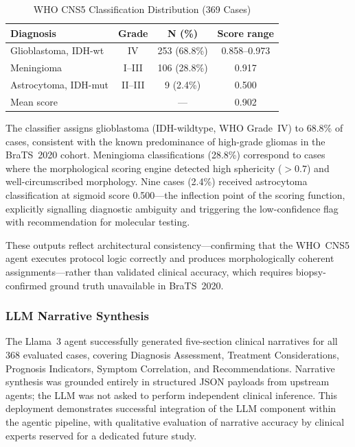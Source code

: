 \documentclass[journal]{IEEEtran}
\begin{document}
\begin{table}[h]
\centering
\caption{WHO CNS5 Classification Distribution (369 Cases)}
\label{tab:who}
\begin{tabular}{lccc}
\toprule
\textbf{Diagnosis} & \textbf{Grade} & \textbf{N (\%)} &
\textbf{Score range} \\
\midrule
Glioblastoma, IDH-wt  & IV    & 253 (68.8\%) & 0.858--0.973 \\
Meningioma            & I--III & 106 (28.8\%) & 0.917 \\
Astrocytoma, IDH-mut  & II--III & 9 (2.4\%)  & 0.500 \\
\midrule
Mean score            &       & ---          & 0.902 \\
\bottomrule
\end{tabular}
\end{table}

The classifier assigns glioblastoma (IDH-wildtype, WHO Grade~IV) to 68.8\%
of cases, consistent with the known predominance of high-grade gliomas in
the BraTS~2020 cohort. Meningioma classifications (28.8\%) correspond to
cases where the morphological scoring engine detected high sphericity
($>0.7$) and well-circumscribed morphology. Nine cases (2.4\%) received
astrocytoma classification at sigmoid score 0.500---the inflection point
of the scoring function, explicitly signalling diagnostic ambiguity and
triggering the low-confidence flag with recommendation for molecular
testing.

These outputs reflect architectural consistency---confirming that the
WHO~CNS5 agent executes protocol logic correctly and produces morphologically
coherent assignments---rather than validated clinical accuracy, which
requires biopsy-confirmed ground truth unavailable in BraTS~2020.

\subsubsection{LLM Narrative Synthesis}

The Llama~3 agent successfully generated five-section clinical narratives
for all 368 evaluated cases, covering Diagnosis Assessment, Treatment
Considerations, Prognosis Indicators, Symptom Correlation, and
Recommendations. Narrative synthesis was grounded entirely in structured
JSON payloads from upstream agents; the LLM was not asked to perform
independent clinical inference. This deployment demonstrates successful
integration of the LLM component within the agentic pipeline, with
qualitative evaluation of narrative accuracy by clinical experts reserved
for a dedicated future study.
\end{document}
